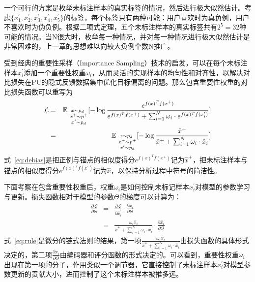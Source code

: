 一个可行的方案是枚举未标注样本的真实标签的情况，然后进行极大似然估计。考虑$\{x_1^\prime,x_2^\prime,x_3^\prime,x_4^\prime,x_5^\prime\}$的标签，每个标签只有两种可能：用户喜欢时为真负例，用户不喜欢时为伪负例。根据二项式定理，五个未标注样本的真实标签共有$2^5=32$种可能的情况。当N很大时，枚举每一种情况，并对每一种情况进行极大似然估计是非常困难的，上一章的思想难以向较大负例个数N推广。

受到经典的重要性采样（Importance Sampling）技术的启发，可以在每个未标注样本$x_i^\prime$添加一个重要性权重$\omega_i$，从而灵活的实现样本的均匀性和对齐性，以解决对比损失在PU的隐式反馈数据集中优化目标偏离的问题。那么包含重要性权重的对比损失函数可以重写为
\begin{eqnarray}
	\small
	\mathcal{L} &=& \mathbb E_{ \substack{x \sim p_d\\~x^+ \sim p^+\\{~x^\prime \sim p_d}}}
	[-\log \frac{e^{f(x)^Tf(x^+)}}{e^{f(x)^Tf(x^+)} + \sum_{i=1}^{N} \omega_i \cdot e^{f(x)^Tf(x_i^\prime)}}] \nonumber \\
	&=& \mathbb E_{ \substack{x \sim p_d\\~x^+ \sim p^+\\{~x^\prime \sim p_d}}}
	[-\log \frac{\hat{x}^+}{{\hat{x}^+} + \sum_{i=1}^{N} \omega_i \cdot \hat{x}_i}] \label{eq:debias}
\end{eqnarray}
式~\eqref{eq:debias}是把正例与锚点的相似度得分$e^{f(x)^Tf(x^+)}$记为$\hat{x}^+$，把未标注样本与锚点的相似度得分$e^{f(x)^Tf(x^\prime)}$记为$\hat{x}$，以保持分析过程中符号的简洁性。
		
下面考察在包含重要性权重后，权重$\omega_i$是如何控制未标记样本$x^\prime_i$对模型的参数学习与更新。损失函数相对于模型的参数$\Theta$的梯度可以计算为：
\begin{eqnarray}
\frac{\partial\mathcal{L}}{\partial \Theta} &=& \frac{\partial\mathcal{L}}{\partial \hat{x}_i^\prime} \cdot \frac{\partial \hat{x}_i}{\partial\Theta} \\
&=&  \frac{ \omega_i\hat{x}_i} {\hat{x}^+ + \sum_{i=1}^{N} \omega_i \cdot \hat{x}_i}\cdot \frac{\partial \hat{x}_i}{\partial\Theta} \label{eq:rule}
\end{eqnarray}
式~\eqref{eq:rule}是微分的链式法则的结果，第一项$\frac{ \omega_i\hat{x}_i} {\hat{x}^+ + \sum_{i=1}^{N} \omega_i \cdot \hat{x}_i}$由损失函数的具体形式决定的，第二项$ \frac{\partial \hat{x}_i}{\partial\Theta}$由编码器和评分函数的形式决定的。可以看到，重要性权重$\omega_i$出现在第一项的分子，作用类似一个调节器，它直接控制了未标注样本$x_i^\prime$对模型参数更新的贡献大小，进而控制了这个未标注样本被推多远。

